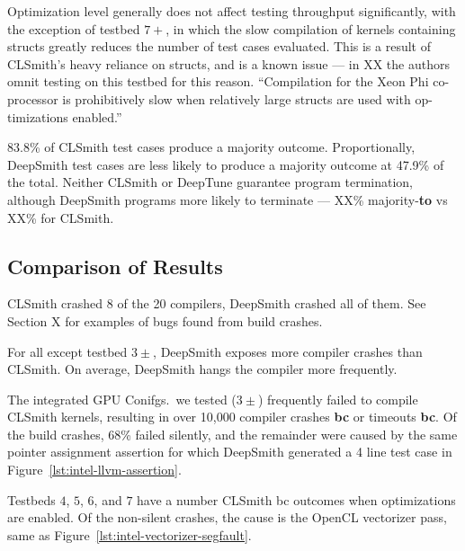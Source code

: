 Optimization level generally does not affect testing throughput significantly, with the exception of testbed $7+$, in which the slow compilation of kernels containing structs greatly reduces the number of test cases evaluated. This is a result of CLSmith's heavy reliance on structs, and is a known issue --- in XX the authors omnit testing on this testbed for this reason. ``Compilation for the Xeon Phi co-processor is prohibitively slow when relatively large structs are used with op- timizations enabled.''

83.8\% of CLSmith test cases produce a majority \textbf{\cmark} outcome. Proportionally, DeepSmith test cases are less likely to produce a majority outcome at 47.9\% of the total. Neither CLSmith or DeepTune guarantee program termination, although DeepSmith programs more likely to terminate --- XX\% majority-\textbf{to} vs XX\% for CLSmith.


\subsection{Comparison of Results}

CLSmith crashed 8 of the 20 compilers, DeepSmith crashed all of them. See Section X for examples of bugs found from build crashes.

For all except testbed $3\pm$, DeepSmith exposes more compiler crashes than CLSmith. On average, DeepSmith hangs the compiler more frequently. \cc{\ldots}

The integrated GPU Conifgs.\ we tested ($3\pm$) frequently failed to compile CLSmith kernels, resulting in over 10,000 compiler crashes \textbf{bc} or timeouts \textbf{bc}.
Of the build crashes, 68\% failed silently, and the remainder were caused by the same pointer assignment assertion for which DeepSmith generated a 4 line test case in Figure~\ref{lst:intel-llvm-assertion}. 

Testbeds $4$, $5$, $6$, and $7$ have a number CLSmith bc outcomes when optimizations are enabled. Of the non-silent crashes, the cause is the OpenCL vectorizer pass, same as Figure~\ref{lst:intel-vectorizer-segfault}.



